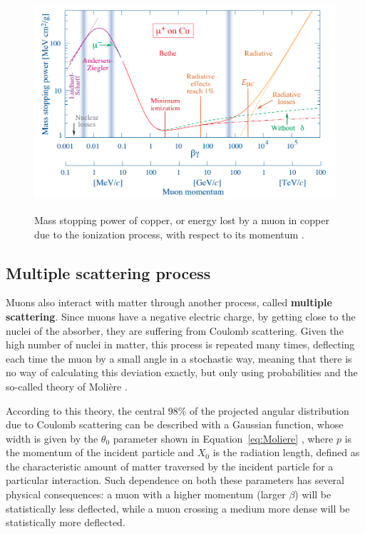 \documentclass[a4paper, 11pt]{report}
\begin{document}
\begin{figure}[htbp]
\begin{center}
\includegraphics[width=12cm, height=8cm]{figs/BB.png}
\caption{Mass stopping power of copper, or energy lost by a muon in copper due to the ionization process, with respect to its momentum \cite{PDGMuons}.}
\label{figure:BB}
\end{center}
\end{figure}

\subsection{Multiple scattering process}

Muons also interact with matter through another process, called \textbf{multiple scattering}. Since muons have a negative electric charge, by getting close to the nuclei of the absorber, they are suffering from Coulomb scattering. Given the high number of nuclei in matter, this process is repeated many times, deflecting each time the muon by a small angle in a stochastic way, meaning that there is no way of calculating this deviation exactly, but only using probabilities and the so-called theory of Moli\`ere \cite{Moliere}.

According to this theory, the central 98\% of the projected angular distribution due to Coulomb scattering can be described with a Gaussian function, whose width is given by the $\theta_0$ parameter shown in Equation~\ref{eq:Moliere} \cite{PDGScat}, where $p$ is the momentum of the incident particle and $X_0$ is the radiation length, defined as the characteristic amount of matter traversed by the incident particle for a particular interaction. Such dependence on both these parameters has several physical consequences: a muon with a higher momentum (larger $\beta$) will be statistically less deflected, while a muon crossing a medium more dense will be statistically more deflected.
\end{document}
